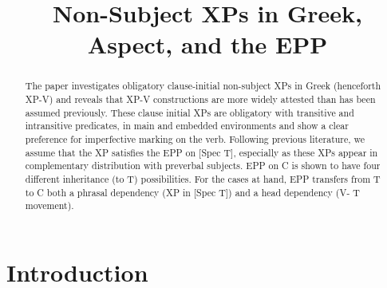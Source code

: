 \documentclass[11pt]{article}
\begin{document}

\title{Non-Subject XPs in Greek, Aspect, and the EPP} %


\maketitle



 




\maketitle

 \begin{abstract}
 The paper investigates obligatory clause-initial non-subject XPs in Greek (henceforth XP-V) and reveals that XP-V constructions are more widely attested than has been assumed previously.  These clause initial XPs are obligatory with transitive and intransitive predicates, in main and embedded environments and show a clear preference for imperfective marking on the verb.  Following previous literature, we assume that the XP satisfies the EPP on [Spec T], especially as these XPs appear in complementary distribution with preverbal subjects.  EPP on C is shown to have four different inheritance (to T) possibilities. For the cases at hand, EPP transfers from T to C both a phrasal dependency (XP in [Spec T]) and a head dependency (V- T movement). 
 \end{abstract}

\section{Introduction}
\end{document}
